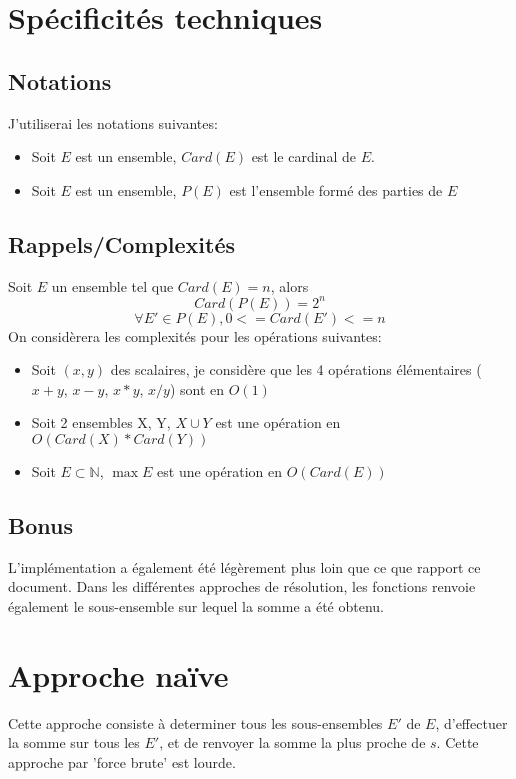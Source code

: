 \documentclass[10pt]{article}
\begin{document}
	\newpage
	\section{Spécificités techniques}\label{approche_naive}
		\subsection{Notations}
			J'utiliserai les notations suivantes:
			\begin{itemize}[label=-]
				\setlength\itemsep{0.1em}
				\item Soit $E$ est un ensemble, $Card(E)$ est le cardinal de $E$.
				\item Soit $E$ est un ensemble, $P(E)$ est l'ensemble formé des parties de $E$
			\end{itemize}
		\subsection{Rappels/Complexités}
			Soit $E$ un ensemble tel que $Card(E) = n$, alors
			$$Card(P(E)) = 2^n$$
			$$\forall E' \in P(E) , 0 <= Card(E') <= n$$
			\newline
			\newline
			On considèrera les complexités pour les opérations suivantes:
			\begin{itemize}[label=-]
				\setlength\itemsep{0.1em}
				\item Soit $(x, y)$ des scalaires, je considère que les 4 opérations élémentaires ($x+y$, $x-y$, $x*y$, $x/y$) sont en $O(1)$
				\item Soit 2 ensembles X, Y, $X \cup Y$ est une opération en $O(Card(X) * Card(Y))$
				\item Soit $E \subset \mathbb{N}$, $\max{E}$ est une opération en $O(Card(E))$
			\end{itemize}
			
			\subsection{Bonus}\label{bonus}
				L'implémentation a également été légèrement plus loin que ce que rapport ce document.
				Dans les différentes approches de résolution, les fonctions renvoie également
				le sous-ensemble sur lequel la somme a été obtenu.

	\newpage
	\section{Approche naïve}\label{approche_naive}
		Cette approche consiste à determiner tous les sous-ensembles $E'$ de $E$, d'effectuer la somme sur
		tous les $E'$, et de renvoyer la somme la plus proche de $s$. Cette approche par 'force brute' est lourde.
		\newline
		\newline
\end{document}
